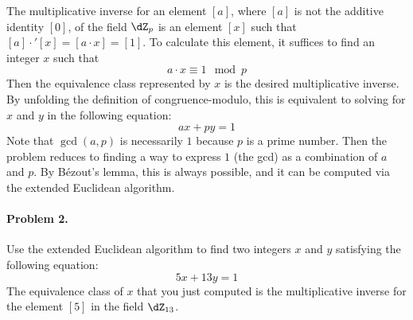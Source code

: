 \documentclass[article,10pt,oneside]{memoir}
\begin{document}
The multiplicative inverse for an element $[a]$, where $[a]$ is not the additive identity $[0]$, of the field $\dZ_{p}$ is an element $[x]$ such that $[a] \cdot' [x] = [a \cdot x] = [1]$.
To calculate this element, it suffices to find an integer $x$ such that
\[
  a \cdot x \equiv 1 \mod p
\]
Then the equivalence class represented by $x$ is the desired multiplicative inverse.
By unfolding the definition of congruence-modulo, this is equivalent to solving for $x$ and $y$ in the following equation:
\[
  ax + py = 1
\]
Note that $\gcd(a, p)$ is necessarily $1$ because $p$ is a prime number.
Then the problem reduces to finding a way to express $1$ (the gcd) as a combination of $a$ and $p$.
By B\'ezout's lemma, this is always possible, and it can be computed via the extended Euclidean algorithm.
%
\paragraph{Problem 2.} Use the extended Euclidean algorithm to find two integers $x$ and $y$ satisfying the following equation:
\[
  5x + 13y = 1
\]
The equivalence class of $x$ that you just computed is the multiplicative inverse for the element $[5]$ in the field $\dZ_{13}$.
\framebox[\textwidth]{\rule{0pt}{\textheight-\pagetotal}}
\end{document}
